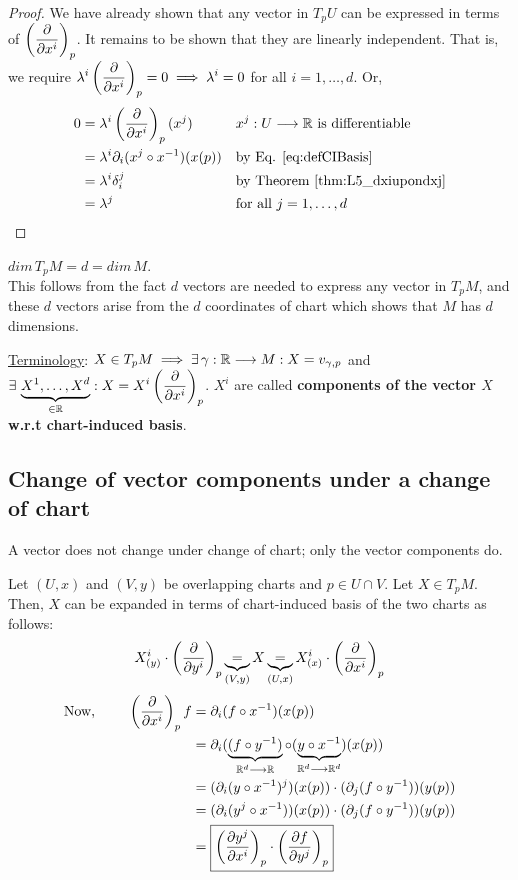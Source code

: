 \begin{proof} We have already shown that any vector in $T_pU$ can be expressed in terms of $\displaystyle\left(\cibasis{x^i}\right)_p$. It remains to be shown that they are linearly independent. That is, we require $\displaystyle\lambda^i \left(\cibasis{x^i}\right)_p = 0 \implies \lambda^i = 0$ for all $i = 1, \dotsc, d$. Or,
\begin{align*}
0 & = \lambda^i \left(\cibasis{x^i}\right)_p(x^j) && x^j : U \to \R \text{ is differentiable}\\
& = \lambda^i \partial_i (x^j \after x^{-1})(x(p)) && \text{by Eq. \ref{eq:defCIBasis}} \\
& = \lambda^i \delta^j_i && \text{by Theorem \ref{thm:L5_dxiupondxj}} \\
& = \lambda^j && \text{for all } j = 1, \dotsc, d 
\end{align*}
\end{proof}

\begin{corollary}
$dim \, T_pM = d = dim \, M$. \\
This follows from the fact $d$ vectors are needed to express any vector in $T_pM$, and these $d$ vectors arise from the $d$ coordinates of chart which shows that $M$ has $d$ dimensions.
\end{corollary}

\underline{Terminology}: $X \in T_pM \implies \exists \, \gamma : \R \to M : X = v_{\gamma,p}$ and $\displaystyle \exists \, \underbrace{X^1, \dotsc, X^d}_{\in \R} : X = X^i \left(\cibasis{x^i}\right)_p$. $X^i$ are called \textbf{components of the vector $X$ w.r.t chart-induced basis}.

\subsection{Change of vector components under a change of chart}
 A vector does not change under change of chart; only the vector components do.

Let $(U,x)$ and $(V,y)$ be overlapping charts and $p \in U \cap V$. Let $X \in T_pM$. Then, $X$ can be expanded in terms of chart-induced basis of the two charts as follows:
\begin{equation}\label{eq:L5_VecExpandedIn2Charts}
X^i_{(y)} \cdot \left(\cibasis{y^i}\right)_p \underbrace{=}_{(V,y)} X \underbrace{=}_{(U,x)} X^i_{(x)} \cdot \left(\cibasis{x^i}\right)_p
\end{equation}
\begin{align*}
  \text{Now, } \quad \quad \left(\cibasis{x^i}\right)_p f & = \partial_i(f \after x^{-1})(x(p)) \\
  & = \partial_i (\underbrace{(f \after y^{-1})}_{\R^d \to \R} \after (\underbrace{y \after x^{-1}}_{\R^d \to \R^d})(x(p)) \\
  & = (\partial_i (y \after x^{-1})^j)(x(p)) \cdot (\partial_j (f \after y^{-1}))(y(p)) \\
  & = (\partial_i (y^j \after x^{-1}))(x(p)) \cdot (\partial_j (f \after y^{-1}))(y(p)) \\
  & = \boxed{\left(\cibasis[y^j]{x^i}\right)_p \cdot \left(\cibasis[f]{y^j}\right)_p}
\end{align*}

